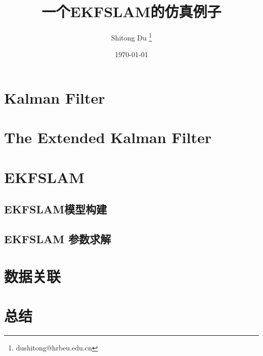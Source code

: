\documentclass[UTF8,a4paper,10pt]{ctexart}
\title{一个EKFSLAM的仿真例子}
\author{ Shitong Du 
  \thanks{dushitong@hrbeu.edu.cn} 
}
\date{\today}
\begin{document}
    \maketitle
\begin{abstract}

\end{abstract}
\section{Kalman Filter} 
\label{sec:one}



\section{The Extended Kalman Filter}


\section{EKFSLAM}
\subsection{EKFSLAM模型构建}
\label{moxing}

\subsection{EKFSLAM 参数求解}


\section{数据关联}


\section{总结}
\end{document}
